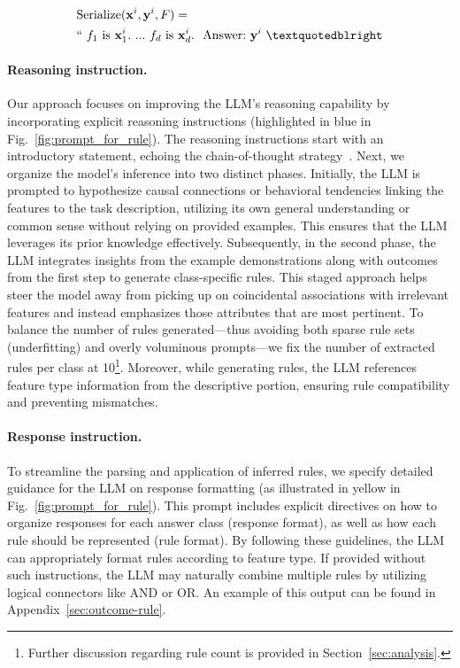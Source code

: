 \begin{align}
&\text{Serialize}(\mathbf{x}^i,\mathbf{y}^i, F) = \nonumber \\ 
&``\ f_1\ \text{is}\ \mathbf{x}^i_1.\ ... \ f_d\  \text{is}\  \mathbf{x}^i_d.\ \ \text{Answer:}\  \mathbf{y}^i\ ”
\end{align}

\vspace*{-0.12in}
\paragraph{Reasoning instruction.} Our approach focuses on improving the LLM's reasoning capability by incorporating explicit reasoning instructions (highlighted in blue in Fig.~\ref{fig:prompt_for_rule}). The reasoning instructions start with an introductory statement, echoing the chain-of-thought strategy~\cite{wei2022chain}. Next, we organize the model’s inference into two distinct phases. Initially, the LLM is prompted to hypothesize causal connections or behavioral tendencies linking the features to the task description, utilizing its own general understanding or common sense without relying on provided examples. This ensures that the LLM leverages its prior knowledge effectively. Subsequently, in the second phase, the LLM integrates insights from the example demonstrations along with outcomes from the first step to generate class-specific rules. This staged approach helps steer the model away from picking up on coincidental associations with irrelevant features and instead emphasizes those attributes that are most pertinent. To balance the number of rules generated—thus avoiding both sparse rule sets (underfitting) and overly voluminous prompts—we fix the number of extracted rules per class at 10\footnote{Further discussion regarding rule count is provided in Section~\ref{sec:analysis}.}. Moreover, while generating rules, the LLM references feature type information from the descriptive portion, ensuring rule compatibility and preventing mismatches.

\vspace*{-0.12in}
\paragraph{Response instruction.} To streamline the parsing and application of inferred rules, we specify detailed guidance for the LLM on response formatting (as illustrated in yellow in Fig.~\ref{fig:prompt_for_rule}). This prompt includes explicit directives on how to organize responses for each answer class (response format), as well as how each rule should be represented (rule format). By following these guidelines, the LLM can appropriately format rules according to feature type. If provided without such instructions, the LLM may naturally combine multiple rules by utilizing logical connectors like AND or OR. An example of this output can be found in Appendix~\ref{sec:outcome-rule}.

